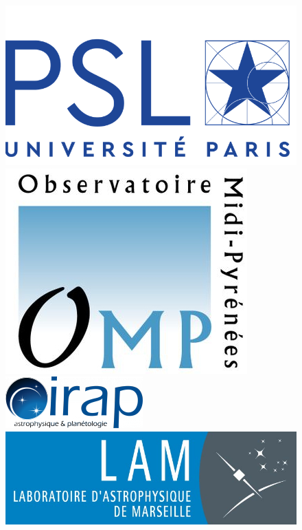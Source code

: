 \begin{titlepage}
\begin{center}
        \begin{figure}[htbp]
             \centering
             \vspace{.25cm}
             \includegraphics[width=.25\linewidth]{./Figures/psl_logo.png}
             \hspace{35pt}
             \includegraphics[width=.17\linewidth]{./Figures/omp_logo.jpg} \\
             \vspace{.25cm}
             \hspace{35pt}
             \includegraphics[width=.25\linewidth]{./Figures/irap_logo.png}
             \hspace{35pt}
             \includegraphics[width=.25\linewidth]{./Figures/Logo_LAM_petit.jpg}
        \end{figure}

    \end{center}
\end{titlepage}
\makeatother